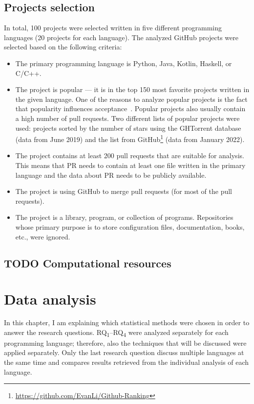 \documentclass[digital,oneside,oldtable,nolof,nolot,nocover]{fithesis4}
\begin{document}
\section{Projects selection}
\label{sec:org0163e19}
In total, 100 projects were selected written in five different
programming languages (20 projects for each language).  The analyzed GitHub
projects were selected based on the following criteria:
\begin{itemize}
\item The primary programming language is Python, Java, Kotlin, Haskell, or C/C++.
\item The project is popular --- it is in the top 150 most favorite projects written in the given language.
One of the reasons to analyze popular projects is the fact that popularity influences acceptance~\cite{social}.
Popular projects also usually contain a high number of pull requests.
Two different lists of popular projects were used: projects sorted by the
number of stars using the GHTorrent database (data from  June 2019) and the list from
GitHub\footnote{\url{https://github.com/EvanLi/Github-Ranking}} (data from  January 2022).
\item The project contains at least 200 pull requests that are suitable for analysis.
This means that PR needs to contain at least one file written in the
primary language and the data about PR needs to be publicly available.
\item The project is using GitHub to merge pull requests (for most of the pull requests).
\item The project is a library, program, or collection of programs. Repositories whose primary purpose is
to store configuration files, documentation, books, etc., were ignored.
\end{itemize}
\section{{\bfseries\sffamily TODO} Computational resources}
\label{sec:org6ff6fe1}
\chapter{Data analysis}
\label{sec:org71ac403}
In this chapter, I am explaining which statistical methods were chosen in
order to answer the research questions. RQ\textsubscript{1}--RQ\textsubscript{4} were
analyzed separately for each programming language; therefore, also the
techniques that will be discussed were applied separately.  Only the last
research question discuss multiple languages at the same time and compares
results retrieved from the individual analysis of each language.
\end{document}
